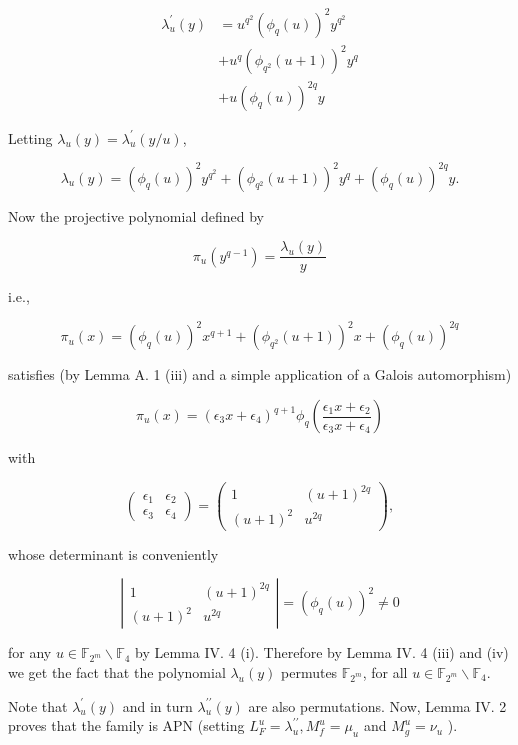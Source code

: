 \documentclass[10pt]{article}
\begin{document}
\begin{align*}
\lambda_{u}^{\prime}(y) & =u^{q^{2}}\left(\phi_{q}(u)\right)^{2} y^{q^{2}} \\
& +u^{q}\left(\phi_{q^{2}}(u+1)\right)^{2} y^{q} \\
& +u\left(\phi_{q}(u)\right)^{2 q} y \tag{11}
\end{align*}


Letting $\lambda_{u}(y)=\lambda_{u}^{\prime}(y / u)$,

$$
\lambda_{u}(y)=\left(\phi_{q}(u)\right)^{2} y^{q^{2}}+\left(\phi_{q^{2}}(u+1)\right)^{2} y^{q}+\left(\phi_{q}(u)\right)^{2 q} y .
$$

Now the projective polynomial defined by

$$
\pi_{u}\left(y^{q-1}\right)=\frac{\lambda_{u}(y)}{y}
$$

i.e.,

$$
\pi_{u}(x)=\left(\phi_{q}(u)\right)^{2} x^{q+1}+\left(\phi_{q^{2}}(u+1)\right)^{2} x+\left(\phi_{q}(u)\right)^{2 q}
$$

satisfies (by Lemma A. 1 (iii) and a simple application of a Galois automorphism)

$$
\pi_{u}(x)=\left(\epsilon_{3} x+\epsilon_{4}\right)^{q+1} \phi_{q}\left(\frac{\epsilon_{1} x+\epsilon_{2}}{\epsilon_{3} x+\epsilon_{4}}\right)
$$

with

$$
\left(\begin{array}{ll}
\epsilon_{1} & \epsilon_{2} \\
\epsilon_{3} & \epsilon_{4}
\end{array}\right)=\left(\begin{array}{cc}
1 & (u+1)^{2 q} \\
(u+1)^{2} & u^{2 q}
\end{array}\right),
$$

whose determinant is conveniently

$$
\left|\begin{array}{cc}
1 & (u+1)^{2 q} \\
(u+1)^{2} & u^{2 q}
\end{array}\right|=\left(\phi_{q}(u)\right)^{2} \neq 0
$$

for any $u \in \mathbb{F}_{2^{m}} \backslash \mathbb{F}_{4}$ by Lemma IV. 4 (i). Therefore by Lemma IV. 4 (iii) and (iv) we get the fact that the polynomial $\lambda_{u}(y)$ permutes $\mathbb{F}_{2^{m}}$, for all $u \in \mathbb{F}_{2^{m}} \backslash \mathbb{F}_{4}$.

Note that $\lambda_{u}^{\prime}(y)$ and in turn $\lambda_{u}^{\prime \prime}(y)$ are also permutations. Now, Lemma IV. 2 proves that the family is APN (setting $L_{F}^{u}=\lambda_{u}^{\prime \prime}, M_{f}^{u}=\mu_{u}$ and $M_{g}^{u}=\nu_{u}$ ).
\end{document}
